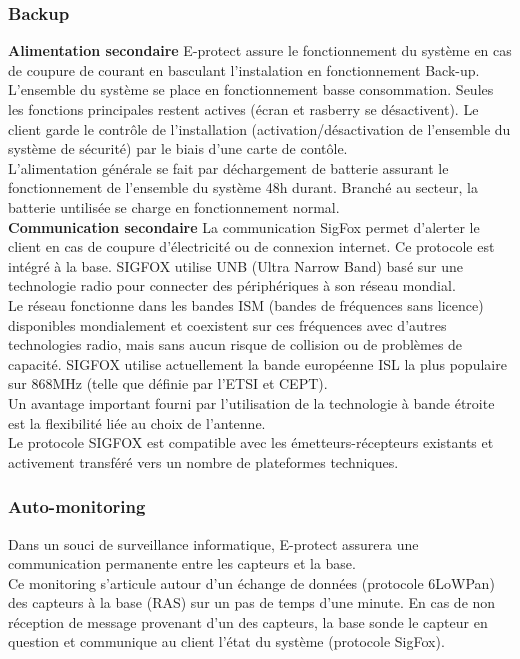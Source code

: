 \subsubsection{Backup}
\textbf{Alimentation secondaire}
E-protect assure le fonctionnement du système en cas de coupure de courant en basculant l'instalation en fonctionnement Back-up.\\
L'ensemble du système se place en fonctionnement basse consommation. Seules les fonctions principales restent actives (écran et rasberry se désactivent). Le client garde le contrôle de l'installation (activation/désactivation de l'ensemble du système de sécurité) par le biais d'une carte de contôle.\\
L'alimentation générale se fait par déchargement de batterie assurant le fonctionnement de l'ensemble du système 48h durant. Branché au secteur, la batterie untilisée se charge en fonctionnement normal.\\
\textbf{Communication secondaire}
La communication SigFox permet d’alerter le client en cas de coupure d’électricité ou de connexion internet. Ce protocole est intégré à la base.
SIGFOX utilise UNB (Ultra Narrow Band) basé sur une technologie radio pour connecter des périphériques à son réseau mondial.\\
Le réseau fonctionne dans les bandes ISM (bandes de fréquences sans licence) disponibles mondialement et coexistent sur ces fréquences avec d'autres technologies radio, mais sans aucun risque de collision ou de problèmes de capacité. SIGFOX utilise actuellement la bande européenne ISL la plus populaire sur 868MHz (telle que définie par l'ETSI et CEPT).\\

Un avantage important fourni par l'utilisation de la technologie à bande étroite est la flexibilité liée au choix de l'antenne.\\

Le protocole SIGFOX est compatible avec les émetteurs-récepteurs existants et activement transféré vers un nombre de plateformes techniques.\cite{www:Sigfox}\\

\subsubsection{Auto-monitoring}
Dans un souci de surveillance informatique, E-protect assurera une communication permanente entre les capteurs et la base.\\
Ce monitoring s’articule autour d’un échange de données (protocole 6LoWPan) des capteurs à la base (RAS) sur un pas de temps d’une minute. En cas de non réception de message provenant d’un des capteurs, la base sonde le capteur en question et communique au client l’état du système (protocole SigFox).\\

